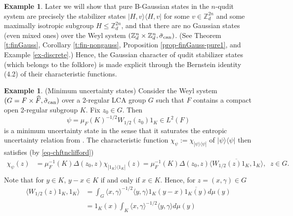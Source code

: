 \documentclass[12pt,reqno]{amsart}
\theoremstyle{definition}
\newtheorem{ex}[thm]{Example}
\theoremstyle{definition}
\theoremstyle{definition}
\numberwithin{thm}{section}
\numberwithin{equation}{section}
\newcommand{\la}{\langle}
\newcommand{\ra}{\rangle}
\newcommand{\z}{\mathbb{Z}}
\newcommand{\tr}{{\rm Tr}\,}
\newcommand{\bZ}{\mathbb{Z}}
\begin{document}
\begin{ex}
Later we will show that pure B-Gaussian states in the $n$-qudit system are precisely the stabilizer states $|H,v\ra\la H,v|$ for some $v\in \z_d^{2n}$ and some maximally isotropic subgroup $H\leq \z_d^{2n}$, and that there are no Gaussian states (even mixed ones) over the Weyl system $(\bZ_d^n\times\bZ_d^n, \tilde{\sigma}_{\rm can})$. (See Theorem \ref{t:finGauss}, Corollary \ref{t:fin-nongauss}, Proposition \ref{prop-finGauss-pure1}, and Example \ref{ex-discrete}.) Hence, the Gaussian character of qudit stabilizer states (which belongs to the folklore) is made explicit through the Bernstein
identity (4.2) of their characteristic functions.
\end{ex}

\begin{ex}\label{ex:UP} (Minimum uncertainty states) Consider the Weyl system $(G=F\times\widehat{F}, \tilde{\sigma}_{\rm can})$ over a 2-regular LCA group $G$ such that $F$ contains a compact open 2-regular subgroup $K$. Fix $z_0\in G$. Then
$$\psi={\mu_F(K)^{-1/2}}W_{1/2}(z_0)1_{K}\in L^2(F)$$
is a minimum uncertainty state in the sense that it saturates the entropic uncertainty relation from \cite[Theorem 1.5]{OP}. The characteristic function $\chi_{\psi}:=\chi_{|\psi\ra\la\psi|}$ of $| \psi \ra \la \psi |$ then satisfies (by \eqref{eq-chftnclifford})
\begin{align*}
\chi_\psi(z)&=\mu^{-1}_F(K)\Delta(z_0,z)\chi_{|1_K\ra\la 1_K|}(z)=\mu^{-1}_F(K)\Delta(z_0,z)\overline{\la W_{1/2}(z)1_K, 1_K\ra},\;\; z\in G.\\
\end{align*}
Note that for $y\in K$, $y-x\in K$ if and only if $x\in K$. Hence, for $z = (x,\gamma) \in G$
\begin{align*}\la W_{1/2}(z)1_K, 1_K\ra&=\int_G\la x, \gamma\ra^{-1/2}\la y, \gamma\ra 1_K(y-x) \overline{1_{K}(y)}d\mu(y)\\
&=1_K(x)\int_K\la x, \gamma\ra^{-1/2}\la y, \gamma\ra d\mu(y)\\

\end{align*}
\end{ex}
\end{document}
